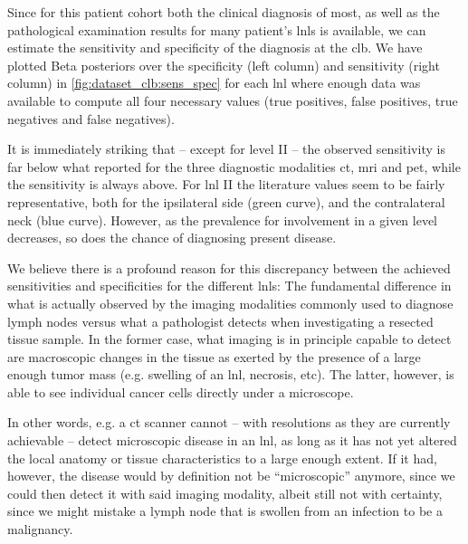 \documentclass[\relativeRoot/main.tex]{subfiles}
\begin{document}
Since for this patient cohort both the clinical diagnosis of most, as well as the pathological examination results for many patient's \glspl{lnl} is available, we can estimate the sensitivity and specificity of the diagnosis at the \gls{clb}. We have plotted Beta posteriors over the specificity (left column) and sensitivity (right column) in \cref{fig:dataset_clb:sens_spec} for each \gls{lnl} where enough data was available to compute all four necessary values (true positives, false positives, true negatives and false negatives).

It is immediately striking that -- except for level II -- the observed sensitivity is far below what  reported for the three diagnostic modalities \gls{ct}, \gls{mri} and \gls{pet}, while the sensitivity is always above. For \gls{lnl} II the literature values seem to be fairly representative, both for the ipsilateral side (green curve), and the contralateral neck (blue curve). However, as the prevalence for involvement in a given level decreases, so does the chance of diagnosing present disease.

We believe there is a profound reason for this discrepancy between the achieved sensitivities and specificities for the different \glspl{lnl}: The fundamental difference in what is actually observed by the imaging modalities commonly used to diagnose lymph nodes versus what a pathologist detects when investigating a resected tissue sample. In the former case, what imaging is in principle capable to detect are macroscopic changes in the tissue as exerted by the presence of a large enough tumor mass (e.g. swelling of an \gls{lnl}, necrosis, etc). The latter, however, is able to see individual cancer cells directly under a microscope.

In other words, e.g. a \gls{ct} scanner cannot -- with resolutions as they are currently achievable -- detect microscopic disease in an \gls{lnl}, as long as it has not yet altered the local anatomy or tissue characteristics to a large enough extent. If it had, however, the disease would by definition not be ``microscopic'' anymore, since we could then detect it with said imaging modality, albeit still not with certainty, since we might mistake a lymph node that is swollen from an infection to be a malignancy.
\end{document}
